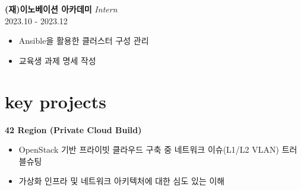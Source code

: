 \documentclass[10pt, a4paper]{article}
\newcommand{\descstyle}{\lightfont\fontsize{9.5pt}{10pt}\selectfont}
\newcommand{\jobtitle}[2]{{\normalsize\textbf{#1}} \hfill {\descstyle\textit{#2}}}
\newcommand{\dates}[1]{\hfill {\descstyle\color{lightGray} #1}}
\begin{document}
\begin{minipage}[t]{0.62\textwidth}
    \vspace{1.2em}

    \jobtitle{(재)이노베이션 아카데미}{Intern} \\
    \dates{2023.10 - 2023.12}
    \begin{itemize}[label=\textbullet]
        \descstyle 
        \item Ansible을 활용한 클러스터 구성 관리
        \item 교육생 과제 명세 작성
    \end{itemize}

    \vspace{1.0em}

    \section*{\huge{key projects}}
    \vspace{0.2em}
    \textbf{42 Region (Private Cloud Build)}
    \begin{itemize}[label=\textbullet]
        \descstyle 
        \item OpenStack 기반 프라이빗 클라우드 구축 중 네트워크 이슈(L1/L2 VLAN) 트러블슈팅
        \item 가상화 인프라 및 네트워크 아키텍처에 대한 심도 있는 이해
    \end{itemize}

\end{minipage}
\end{document}
